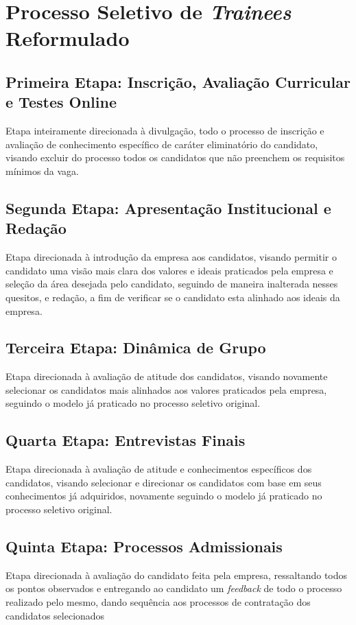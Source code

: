 \section{Processo Seletivo de \textit{Trainees} Reformulado}

\subsection{Primeira Etapa: Inscrição, Avaliação Curricular e Testes Online}

Etapa inteiramente direcionada à divulgação, todo o processo de inscrição e avaliação de conhecimento específico  de caráter eliminatório do candidato, visando excluir do processo todos os candidatos que não preenchem os requisitos mínimos da vaga.

\subsection{Segunda Etapa: Apresentação Institucional e Redação}

Etapa direcionada à introdução da empresa aos candidatos, visando permitir o candidato uma visão mais clara dos valores e ideais praticados pela empresa e seleção da área desejada pelo candidato, seguindo de maneira inalterada nesses quesitos, e redação, a fim de verificar se o candidato esta alinhado aos ideais da empresa.

\subsection{Terceira Etapa: Dinâmica de Grupo}

Etapa direcionada à avaliação de atitude dos candidatos, visando novamente selecionar os candidatos mais alinhados aos valores praticados pela empresa, seguindo o modelo já praticado no processo seletivo original.  

\subsection{Quarta Etapa: Entrevistas Finais}

Etapa direcionada à avaliação de atitude e conhecimentos específicos dos candidatos, visando  selecionar e direcionar os candidatos com base em seus conhecimentos já adquiridos, novamente seguindo o modelo já praticado no processo seletivo original.  

\subsection{Quinta Etapa: Processos Admissionais}

Etapa direcionada à avaliação do candidato feita pela empresa, ressaltando todos os pontos observados e entregando ao candidato um \textit{feedback} de todo o processo realizado pelo mesmo, dando sequência aos processos de contratação dos candidatos selecionados